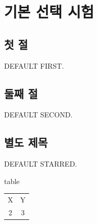 \documentclass[draft]{pnuthesis2026}
\begin{document}
\PNUStartBody
\chapter{기본 선택 시험}\section{첫 절}DEFAULT FIRST.
\section[Short title]{둘째 절}DEFAULT SECOND.
\section*{별도 제목}DEFAULT STARRED.
\begin{PNUObject}{table}\caption{Small default object}
\centering\begin{tabular}{cc}X&Y\\2&3\end{tabular}\end{PNUObject}
\end{document}
